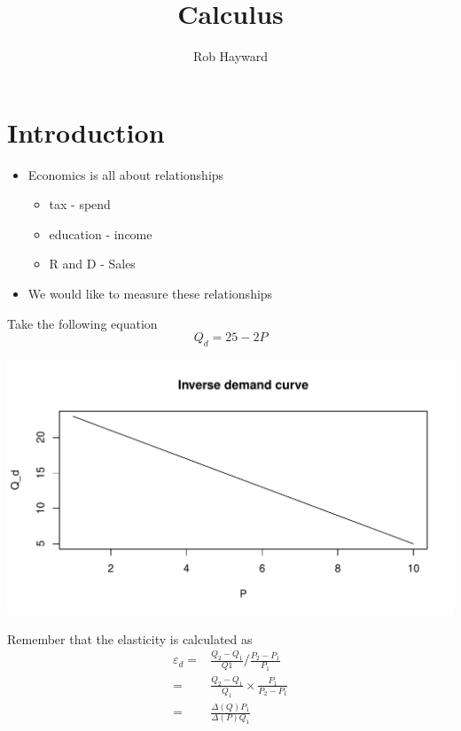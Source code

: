 \documentclass[12pt, a4paper, oneside]{article}\usepackage[]{graphicx}\usepackage[]{color}
\makeatletter
\def\maxwidth{ %
  \ifdim\Gin@nat@width>\linewidth
    \linewidth
  \else
    \Gin@nat@width
  \fi
}
\newenvironment{knitrout}{}{} %
\makeatother
\begin{document}
\title{Calculus}
\author{Rob Hayward}
\maketitle
\section*{Introduction}
\begin{itemize}
\item Economics is all about relationships
\begin{itemize}
\item tax - spend
\item education - income
\item R and D - Sales
\end{itemize}

\item We would like to measure these relationships
\end{itemize}

Take the following equation
\begin{equation*}
Q_d = 25 - 2P
\end{equation*}

\begin{knitrout}
\color{fgcolor}
\includegraphics[width=\maxwidth]{figure/demand-1} 

\end{knitrout}
Remember that the elasticity is calculated as 
\begin{align*}
\varepsilon_d =& \frac{Q_2 - Q_1}{Q1}/\frac{P_2 - P_1}{P_1}\\
          =& \frac{Q_2 - Q_1}{Q_1} \times \frac{P_1}{P_2 - P_1}\\
          =& \frac{\Delta(Q) P_1}{\Delta(P) Q_1}
\end{align*}
\end{document}
